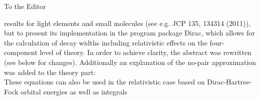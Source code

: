 \documentclass[DIN,pagenumber=false,parskip=half,fromalign=left,fromphone=true,fromemail=true,fromurl=false,fromlogo=false,fromrule=false]{scrlttr2}
\begin{document}
\begin{letter}{To the Editor}
\begin{enumerate}
         results for light elements and small molecules (see
         e.g. JCP 135, 134314 (2011)), but to present its implementation in the
         program package Dirac, which allows for the calculation of decay
         widths including relativistic effects on the four-component level of
         theory. In order to achieve clarity, the abstract was rewritten (see
         below for changes). Additionally an explanation of the no-pair
         approximation was added to the theory part:\\
         These equations can also be used in the relativistic case based on
         Dirac-Hartree-Fock orbital energies as well as integrals
         {}
\end{enumerate}
\end{letter}
\end{document}
